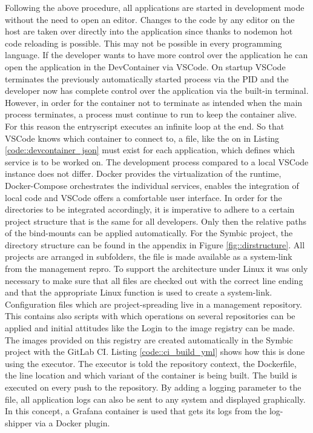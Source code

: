         Following the above procedure, all applications are started in development mode without the need to open an editor. Changes to the code by any editor on the host are taken over directly into the application since thanks to nodemon hot code reloading is possible. This may not be possible in every programming language. \newline
        If the developer wants to have more control over the application he can open the application in the DevContainer via \ac{VSCode}. On startup \ac{VSCode} terminates the previously automatically started process via the \ac{PID} and the developer now has complete control over the application via the built-in terminal. However, in order for the container not to terminate as intended when the main process terminates, a process must continue to run to keep the container alive. For this reason the entryscript executes an infinite loop at the end. So that \ac{VSCode} knows which container to connect to, a  file, like the on in Listing \ref{code::devcontainer_json} must exist for each application, which defines which service is to be worked on. The development process compared to a local \ac{VSCode} instance does not differ.
        Docker provides the virtualization of the runtime, Docker-Compose orchestrates the individual services, enables the integration of local code and VSCode offers a comfortable user interface. In order for the directories to be integrated accordingly, it is imperative to adhere to a certain project structure that is the same for all developers. Only then the relative paths of the bind-mounts can be applied automatically. For the Symbic project, the directory structure can be found in the appendix in Figure \ref{fig::dirstructure}. All projects are arranged in subfolders, the  file is made available as a system-link from the management repro. To support the architecture under Linux it was only necessary to make sure that all files are checked out with the correct line ending and that the appropriate Linux function is used to create a system-link.\newline
        Configuration files which are project-spreading live in a management repository. This contains also scripts with which operations on several repositories can be applied and initial attitudes like the Login to the image registry can be made. The images provided on this registry are created automatically in the Symbic project with the GitLab CI. Listing \ref{code::ci_build_yml} shows how this is done using the  executor. The executor is told the repository context, the Dockerfile, the line location and which variant of the container is being built. The build is executed on every push to the repository.\newline
        By adding a logging parameter to the  file, all application logs can also be sent to any system and displayed graphically. In this concept, a Grafana container is used that gets its logs from the  log-shipper via a Docker plugin.\newline
        

